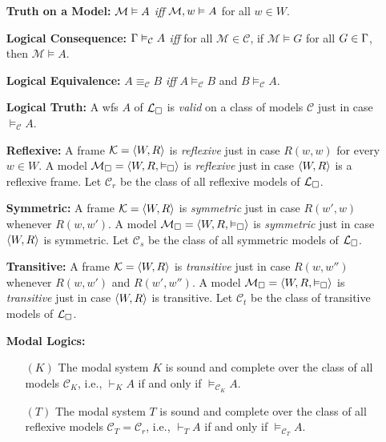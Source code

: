 \documentclass[a4paper, 11pt]{article} %
\begin{document}
\begin{enumerate}[leftmargin=1.2in,labelsep=.15in] %
\item[\bf Truth on a Model:] $\mathcal{M}\vDash A$ \textit{iff} $\mathcal{M},w\vDash A$ for all $w\in W$.
\item[\bf Logical Consequence:] $\Gamma\vDash_\mathcal{C} A$ \textit{iff} for all $\mathcal{M}\in\mathcal{C}$, if $\mathcal{M}\vDash G$ for all $G\in\Gamma$, then $\mathcal{M}\vDash  A$.
\item[\bf Logical Equivalence:] $A\equiv_\mathcal{C} B$ \textit{iff} $A\vDash_\mathcal{C} B$ and $B\vDash_\mathcal{C} A$.  
\item[\bf Logical Truth:] A wfs $A$ of $\mathcal{L}_\square$ is \textit{valid} on a class of models $\mathcal{C}$ just in case $\vDash_\mathcal{C} A$.%
\item[\bf Reflexive:] A frame $\mathcal{K}=\langle W,R\rangle$ is \textit{reflexive} just in case $R(w,w)$ for every $w\in W$. A model $\mathcal{M}_\square=\langle W,R,\vDash_{\square}\rangle$ is \textit{reflexive} just in case $\langle W,R\rangle$ is a reflexive frame. Let $\mathcal{C}_r$ be the class of all reflexive models of $\mathcal{L}_\square$.
\item[\bf Symmetric:] A frame $\mathcal{K}=\langle W,R\rangle$ is \textit{symmetric} just in case $R(w',w)$ whenever $R(w,w')$. A model $\mathcal{M}_\square=\langle W,R,\vDash_{\square}\rangle$ is \textit{symmetric} just in case $\langle W,R\rangle$ is symmetric. Let $\mathcal{C}_s$ be the class of all symmetric models of $\mathcal{L}_\square$.
\item[\bf Transitive:] A frame $\mathcal{K}=\langle W,R\rangle$ is \textit{transitive} just in case $R(w,w'')$ whenever $R(w,w')$ and $R(w',w'')$. A model $\mathcal{M}_\square=\langle W,R,\vDash_{\square}\rangle$ is \textit{transitive} just in case $\langle W,R\rangle$ is transitive. Let $\mathcal{C}_t$ be the class of transitive models of $\mathcal{L}_\square$.
\item[\bf Modal Logics:]
	\begin{enumerate}
	\item[$(K)$] The modal system $K$ is sound and complete over the class of all models $\mathcal{C}_K$, i.e., $\vdash_K A$ if and only if $\vDash_{\mathcal{C}_K} A$.
	\item[$(T)$] The modal system $T$ is sound and complete over the class of all reflexive models $\mathcal{C}_T=\mathcal{C}_r$, i.e., $\vdash_T A$ if and only if $\vDash_{\mathcal{C}_T} A$.

\end{enumerate}
\end{enumerate}
\end{document}
